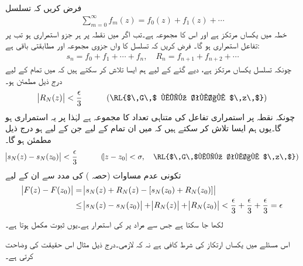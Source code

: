 \quad {}\\
فرض کریں کہ تسلسل
\begin{align*}
\sum\limits_{m=0}^{\infty} f_m(z)=f_0(z)+f_1(z)+\cdots
\end{align*}
خطہ  میں یکساں مرتکز ہے اور اس کا مجموعہ  ہے۔تب اگر  میں نقطہ  پر ہر جزو  استمراری ہو تب  پر تفاعل   استمراری ہو گا۔
\quad
فرض کریں کہ تسلسل کا  واں جزوی مجموعہ  اور مطابقتی باقی  ہے:
\begin{align*}
s_n=f_0+f_1+\cdots+f_n,\quad R_n=f_{n+1}+f_{n+2}+\cdots
\end{align*}
چونکہ تسلسل یکساں مرتکز ہے، دیے گئے  کے لیے ہم ایسا  تلاش کر سکتے ہیں کہ  میں تمام  کے لیے درج ذیل مطمئن ہو۔
\begin{align*}
\abs{R_N(z)}<\frac{\epsilon}{3}\quad \quad \quad (\text{\RL{$\,G\,$ میں تمام $\,z\,$}})
\end{align*}
چونکہ  نقطہ  پر استمراری تفاعل کی متناہی تعداد  کا مجموعہ ہے لہٰذا  پر یہ استمراری ہو گا۔یوں ہم ایسا  تلاش کر سکتے ہیں کہ   میں ان تمام  کے لیے جن کے لیے  ہو درج ذیل مطمئن ہو گا۔
\begin{align*}
\abs{s_N(z)-s_N(z_0)}<\frac{\epsilon}{3}\quad \quad \quad (\abs{z-z_0}<\sigma, \quad \text{\RL{$\,G\,$میں تمام $\,z\,$}})
\end{align*}
تکونی عدم مساوات (حصہ ) کی مدد سے ان  کے لیے
\begin{align*}
\abs{F(z)-F(z_0)}&=\abs{s_N(z)+R_N(z)-[s_N(z_0)+R_N(z_0)]}\\
&\le \abs{s_N(z)-s_N(z_0)}+\abs{R_N(z)}+\abs{R_N(z_0)}<\frac{\epsilon}{3}+\frac{\epsilon}{3}+\frac{\epsilon}{3}=\epsilon
\end{align*}
لکھا جا سکتا ہے جس سے مراد  پر  کی استمرار ہے۔یوں ثبوت مکمل ہوتا ہے۔

اس مسئلے میں یکساں ارتکاز کی شرط  کافی ہے  نہ کہ لازمی۔درج ذیل مثال اس حقیقت کی وضاحت کرتی ہے۔

